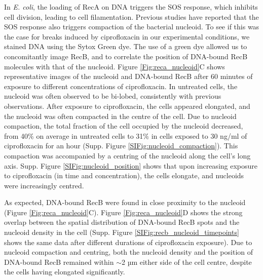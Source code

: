 In \emph{E. coli}, the loading of RecA on DNA triggers the SOS response, which inhibits cell division, leading to cell filamentation. Previous studies have reported that the SOS response also triggers compaction of the bacterial nucleoid\cite{Odsbu2014}. To see if this was the case for breaks induced by ciprofloxacin in our experimental conditions, we stained DNA using the Sytox Green dye. The use of a green dye allowed us to concomitantly image RecB, and to correlate the position of DNA-bound RecB molecules with that of the nucleoid. Figure \ref{Fig:reca_nucleoid}C shows representative images of the nucleoid and DNA-bound RecB after 60 minutes of exposure to different concentrations of ciprofloxacin. In untreated cells, the nucleoid was often observed to be bi-lobed, consistently with previous observations\cite{Lepore2023}. After exposure to ciprofloxacin, the cells appeared elongated, and the nucleoid was often compacted in the centre of the cell. Due to nucleoid compaction, the total fraction of the cell occupied by the nucleoid decreased, from 40\% on average in untreated cells to 31\% in cells exposed to 30 ng/ml of ciprofloxacin for an hour (Supp. Figure \ref{SIFig:nucleoid_compaction}). This compaction was accompanied by a centring of the nucleoid along the cell's long axis. Supp. Figure \ref{SIFig:nucleoid_position} shows that upon increasing exposure to ciprofloxacin (in time and concentration), the cells elongate, and nucleoids were increasingly centred.

As expected, DNA-bound RecB were found in close proximity to the nucleoid (Figure \ref{Fig:reca_nucleoid}C). Figure \ref{Fig:reca_nucleoid}D shows the strong overlap between the spatial distribution of DNA-bound RecB spots and the nucleoid density in the cell (Supp. Figure \ref{SIFig:recb_nucleoid_timepoints} shows the same data after different durations of ciprofloxacin exposure). Due to nucleoid compaction and centring, both the nucleoid density and the position of DNA-bound RecB remained within $\sim$2 µm either side of the cell centre, despite the cells having elongated significantly.

